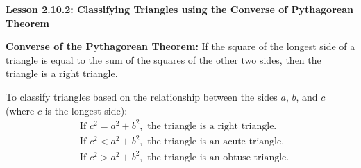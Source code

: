 \begin{center}
\textbf{Lesson 2.10.2: Classifying Triangles using the Converse of Pythagorean Theorem}
\end{center}

\vspace*{1ex}

\textbf{Converse of the Pythagorean Theorem:} If the square of the longest side of a triangle is equal to the sum of the squares of the other two sides, then the triangle is a right triangle.

To classify triangles based on the relationship between the sides \(a\), \(b\), and \(c\) (where \(c\) is the longest side):
\[
\begin{aligned}
    &\text{If } c^2=a^2 + b^2, \text{ the triangle is a right triangle.} \\
    &\text{If } c^2 <  a^2 + b^2, \text{ the triangle is an acute triangle.} \\
    &\text{If } c^2 > a^2 + b^2, \text{ the triangle is an obtuse triangle.}
\end{aligned}
\]
